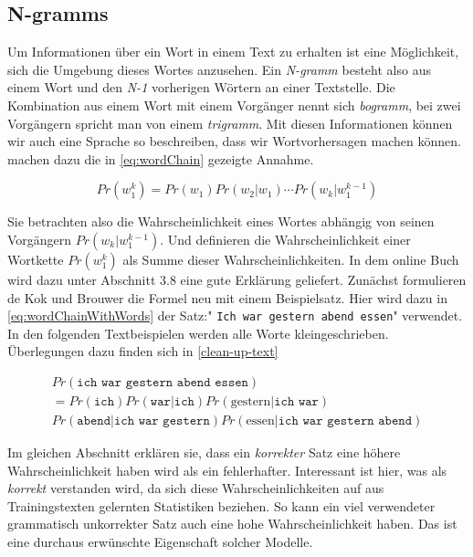 \subsection{N-gramms}
    \label{sec:n-gramms}
    
    Um Informationen über ein Wort in einem Text zu erhalten ist eine Möglichkeit, sich die Umgebung dieses Wortes anzusehen. Ein \emph{N-gramm} besteht also aus einem Wort und den \emph{N-1} vorherigen Wörtern an einer Textstelle. Die Kombination aus einem Wort mit einem Vorgänger nennt sich \emph{bogramm}, bei zwei Vorgängern spricht man von einem \emph{trigramm}. Mit diesen Informationen können wir auch eine Sprache so beschreiben, dass wir Wortvorhersagen machen können. \parencite[S. 468, Gleichung 1]{cumpatationalLinguistics:classBasedNGramms} machen dazu die in \autoref{eq:wordChain} gezeigte Annahme.
        
    \begin{equation}
       	Pr(w_1^k) = Pr(w_1) Pr(w_2|w_1) \cdots Pr(w_k|w_1^{k-1})
       	\label{eq:wordChain}
    \end{equation}
    \newpage
    
    Sie betrachten also die Wahrscheinlichkeit eines Wortes abhängig von seinen Vorgängern \(Pr(w_k|w_1^{k-1})\). Und definieren die Wahrscheinlichkeit einer Wortkette \(Pr(w_1^k)\) als Summe dieser Wahrscheinlichkeiten. In dem online Buch \parencite{nlwp:book} wird dazu unter Abschnitt 3.8 eine gute Erklärung geliefert. Zunächst formulieren de Kok und Brouwer die Formel neu mit einem Beispielsatz. Hier wird dazu in \autoref{eq:wordChainWithWords} der Satz:" \texttt{Ich war gestern abend essen}" verwendet. In den folgenden Textbeispielen werden alle Worte kleingeschrieben. Überlegungen dazu finden sich in \autoref{clean-up-text} 
        
    \begin{equation}
       	\begin{split}
       		Pr(\texttt{ich war gestern abend essen}) \\
            = Pr(\texttt{ich}) Pr(\texttt{war}|\texttt{ich}) Pr(\text{gestern}|\texttt{ich war}) \\
            Pr(\texttt{abend}|\texttt{ich war gestern}) Pr(\text{essen}|\texttt{ich war gestern abend}) 
        \end{split}
        \label{eq:wordChainWithWords}
    \end{equation}
        
    Im gleichen Abschnitt erklären sie, dass ein \emph{korrekter} Satz eine höhere Wahrscheinlichkeit haben wird als ein fehlerhafter. Interessant ist hier, was als \emph{korrekt} verstanden wird, da sich diese Wahrscheinlichkeiten auf aus Trainingstexten gelernten Statistiken beziehen. So kann ein viel verwendeter grammatisch unkorrekter Satz auch eine hohe Wahrscheinlichkeit haben. Das ist eine durchaus erwünschte Eigenschaft solcher Modelle.
        
